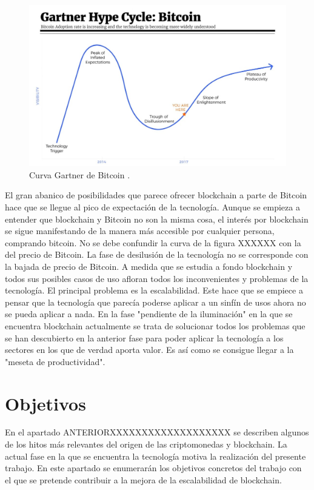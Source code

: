 \begin{figure}
	\centering
	\includegraphics[width=1\textwidth]{imagenes/hypercycle.jpg}
	\caption{\label{fig1}Curva Gartner de Bitcoin \cite{gartner}.}
\end{figure}

El gran abanico de posibilidades que parece ofrecer blockchain a parte de Bitcoin hace que se llegue al pico de expectación de la tecnología. Aunque se empieza a entender que blockchain y Bitcoin no son la misma cosa, el interés por blockchain se sigue manifestando de la manera más accesible por cualquier persona, comprando bitcoin. No se debe confundir la curva de la figura XXXXXX con la del precio de Bitcoin. La fase de desilusión de la tecnología no se corresponde con la bajada de precio de Bitcoin. A medida que se estudia a fondo blockchain y todos sus posibles casos de uso afloran todos los inconvenientes y problemas de la tecnología. El principal problema es la escalabilidad. Este hace que se empiece a pensar que la tecnología que parecía poderse aplicar a un sinfín de usos ahora no se pueda aplicar a nada. En la fase "pendiente de la iluminación" en la que se encuentra blockchain actualmente se trata de solucionar todos los problemas que se han descubierto en la anterior fase para poder aplicar la tecnología a los sectores en los que de verdad aporta valor. Es así como se consigue llegar a la "meseta de productividad".  





\section{Objetivos}

En el apartado ANTERIORXXXXXXXXXXXXXXXXXXX se describen algunos de los hitos más relevantes del origen de las criptomonedas y blockchain. La actual fase en la que se encuentra la tecnología motiva la realización del presente trabajo. En este apartado se enumerarán los objetivos concretos del trabajo con el que se pretende contribuir a la mejora de la escalabilidad de blockchain. \newline

